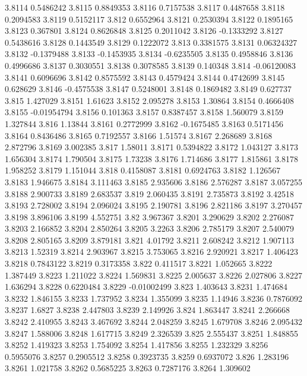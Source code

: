 3.8114  0.5486242
3.8115  0.8849353
3.8116  0.7157538
3.8117  0.4487658
3.8118  0.2094583
3.8119  0.5152117
3.812  0.6552964
3.8121  0.2530394
3.8122  0.1895165
3.8123  0.367801
3.8124  0.8626848
3.8125  0.2011042
3.8126  -0.1333292
3.8127  0.5438616
3.8128  0.1443549
3.8129  0.1222072
3.813  0.3381575
3.8131  0.06324327
3.8132  -0.1379488
3.8133  -0.1453935
3.8134  -0.6235505
3.8135  0.4958846
3.8136  0.4996686
3.8137  0.3030551
3.8138  0.3078585
3.8139  0.140348
3.814  -0.06120083
3.8141  0.6096696
3.8142  0.8575592
3.8143  0.4579424
3.8144  0.4742699
3.8145  0.628629
3.8146  -0.4575538
3.8147  0.5248001
3.8148  0.1869482
3.8149  0.627737
3.815  1.427029
3.8151  1.61623
3.8152  2.095278
3.8153  1.30864
3.8154  0.4666408
3.8155  -0.01954794
3.8156  0.101363
3.8157  0.8387457
3.8158  1.560079
3.8159  1.327844
3.816  1.13844
3.8161  0.2772999
3.8162  -0.1675485
3.8163  0.5171456
3.8164  0.8436486
3.8165  0.7192557
3.8166  1.51574
3.8167  2.268689
3.8168  2.872796
3.8169  3.002385
3.817  1.58011
3.8171  0.5394822
3.8172  1.043127
3.8173  1.656304
3.8174  1.790504
3.8175  1.73238
3.8176  1.714686
3.8177  1.815861
3.8178  1.958252
3.8179  1.151044
3.818  0.4158087
3.8181  0.6924763
3.8182  1.126567
3.8183  1.946675
3.8184  3.111463
3.8185  2.935606
3.8186  2.576287
3.8187  3.057255
3.8188  2.900733
3.8189  2.683537
3.819  2.060435
3.8191  2.735873
3.8192  3.42518
3.8193  2.728002
3.8194  2.096024
3.8195  2.190781
3.8196  2.821186
3.8197  3.270457
3.8198  3.896106
3.8199  4.552751
3.82  3.967367
3.8201  3.290629
3.8202  2.276087
3.8203  2.166852
3.8204  2.850264
3.8205  3.2263
3.8206  2.785179
3.8207  2.540079
3.8208  2.805165
3.8209  3.879181
3.821  4.01792
3.8211  2.608242
3.8212  1.907113
3.8213  1.52319
3.8214  2.903967
3.8215  3.753065
3.8216  2.920921
3.8217  1.406423
3.8218  0.7843122
3.8219  0.3173358
3.822  0.411517
3.8221  1.052665
3.8222  1.387449
3.8223  1.211022
3.8224  1.569831
3.8225  2.005637
3.8226  2.027806
3.8227  1.636294
3.8228  0.6220484
3.8229  -0.01002499
3.823  1.403643
3.8231  1.474684
3.8232  1.846155
3.8233  1.737952
3.8234  1.355099
3.8235  1.14946
3.8236  0.7876092
3.8237  1.6827
3.8238  2.447803
3.8239  2.149926
3.824  1.863447
3.8241  2.266668
3.8242  2.410955
3.8243  3.467692
3.8244  2.048259
3.8245  1.679708
3.8246  2.095432
3.8247  1.588006
3.8248  1.617715
3.8249  2.326539
3.825  2.555437
3.8251  1.848855
3.8252  1.419323
3.8253  1.754092
3.8254  1.417856
3.8255  1.232329
3.8256  0.5955076
3.8257  0.2905512
3.8258  0.3923735
3.8259  0.6937072
3.826  1.283196
3.8261  1.021758
3.8262  0.5685225
3.8263  0.7287176
3.8264  1.309602
